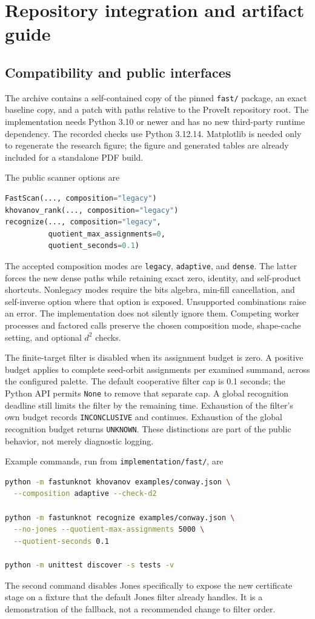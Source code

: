 \section{Repository integration and artifact guide}
\label{sec:integration}

\subsection{Compatibility and public interfaces}

The archive contains a self-contained copy of the pinned \texttt{fast/}
package, an exact baseline copy, and a patch with paths relative to the
ProveIt repository root. The implementation needs Python 3.10 or newer
and has no new third-party runtime dependency. The recorded checks use
Python 3.12.14. Matplotlib is needed only to regenerate the research
figure; the figure and generated tables are already included for a
standalone PDF build.

The public scanner options are
\begin{lstlisting}[language=Python]
FastScan(..., composition="legacy")
khovanov_rank(..., composition="legacy")
recognize(..., composition="legacy",
          quotient_max_assignments=0,
          quotient_seconds=0.1)
\end{lstlisting}
The accepted composition modes are \texttt{legacy}, \texttt{adaptive},
and \texttt{dense}. The latter forces the new dense paths while retaining
exact zero, identity, and self-product shortcuts. Nonlegacy modes require
the bits algebra, min-fill cancellation, and self-inverse option where
that option is exposed. Unsupported combinations raise an error. The
implementation does not silently ignore them. Competing worker processes
and factored calls preserve the chosen composition mode, shape-cache
setting, and optional $d^2$ checks.

The finite-target filter is disabled when its assignment budget is zero.
A positive budget applies to complete seed-orbit assignments per examined
summand, across the configured palette. The default cooperative filter
cap is 0.1 seconds; the Python API permits \texttt{None} to remove that
separate cap. A global recognition deadline still limits the filter by
the remaining time. Exhaustion of the filter's own budget records
\texttt{INCONCLUSIVE} and continues. Exhaustion of the global recognition
budget returns \texttt{UNKNOWN}. These distinctions are part of the
public behavior, not merely diagnostic logging.

Example commands, run from \texttt{implementation/fast/}, are
\begin{lstlisting}[language=bash]
python -m fastunknot khovanov examples/conway.json \
  --composition adaptive --check-d2

python -m fastunknot recognize examples/conway.json \
  --no-jones --quotient-max-assignments 5000 \
  --quotient-seconds 0.1

python -m unittest discover -s tests -v
\end{lstlisting}
The second command disables Jones specifically to expose the new
certificate stage on a fixture that the default Jones filter already
handles. It is a demonstration of the fallback, not a recommended change
to filter order.

